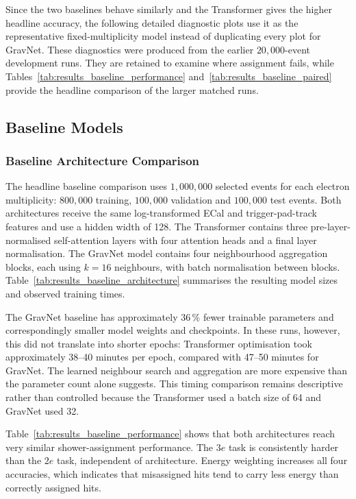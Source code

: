 

Since the two baselines behave similarly and the Transformer gives the higher
headline accuracy, the following detailed diagnostic plots use it as the
representative fixed-multiplicity model instead of duplicating every plot for
GravNet. These diagnostics were produced from the earlier
\(20{,}000\)-event development runs. They are retained to examine where
assignment fails, while Tables~\ref{tab:results_baseline_performance}
and~\ref{tab:results_baseline_paired} provide the headline comparison of the
larger matched runs.



\subsection{Baseline Models}

\subsubsection{Baseline Architecture Comparison}

The headline baseline comparison uses \(1{,}000{,}000\) selected events for
each electron multiplicity: \(800{,}000\) training, \(100{,}000\) validation
and \(100{,}000\) test events.
Both architectures receive the same log-transformed ECal and trigger-pad-track
features and use a hidden width of 128. The Transformer contains three
pre-layer-normalised self-attention layers with four attention heads and a
final layer normalisation. The GravNet model contains four neighbourhood
aggregation blocks, each using \(k=16\) neighbours, with batch normalisation
between blocks. Table~\ref{tab:results_baseline_architecture} summarises the
resulting model sizes and observed training times.



The GravNet baseline has approximately \(36\,\%\) fewer trainable parameters
and correspondingly smaller model weights and checkpoints. In these runs,
however, this did not translate into shorter epochs: Transformer optimisation
took approximately 38--40 minutes per epoch, compared with 47--50 minutes for
GravNet. The learned neighbour search and aggregation are more expensive than
the parameter count alone suggests. This timing comparison remains
descriptive rather than controlled because the Transformer used a batch size
of 64 and GravNet used 32.

Table~\ref{tab:results_baseline_performance} shows that both architectures
reach very similar shower-assignment performance. The \(3e\) task is
consistently harder than the \(2e\) task, independent of architecture. Energy
weighting increases all four accuracies, which indicates that misassigned
hits tend to carry less energy than correctly assigned hits.

